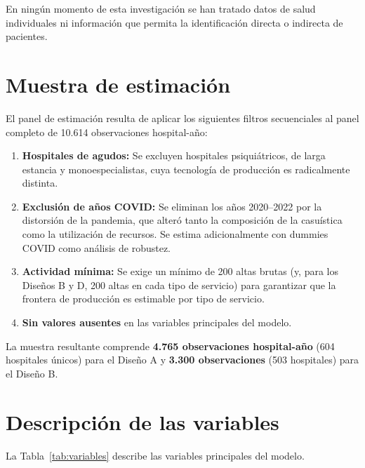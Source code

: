 \documentclass[12pt, a4paper, twoside, openright]{book}
\theoremstyle{plain}
\theoremstyle{definition}
\theoremstyle{remark}
\begin{document}
En ningún momento de esta investigación se han tratado datos de salud individuales ni información que permita la identificación directa o indirecta de pacientes.

\section{Muestra de estimación}

El panel de estimación resulta de aplicar los siguientes filtros secuenciales al panel completo de 10.614 observaciones hospital-año:

\begin{enumerate}
  \item \textbf{Hospitales de agudos:} Se excluyen hospitales psiquiátricos, de larga estancia y monoespecialistas, cuya tecnología de producción es radicalmente distinta.
  \item \textbf{Exclusión de años COVID:} Se eliminan los años 2020--2022 por la distorsión de la pandemia, que alteró tanto la composición de la casuística como la utilización de recursos. Se estima adicionalmente con dummies COVID como análisis de robustez.
  \item \textbf{Actividad mínima:} Se exige un mínimo de 200 altas brutas (y, para los Diseños B y D, 200 altas en cada tipo de servicio) para garantizar que la frontera de producción es estimable por tipo de servicio.
  \item \textbf{Sin valores ausentes} en las variables principales del modelo.
\end{enumerate}

La muestra resultante comprende \textbf{4.765 observaciones hospital-año} (604 hospitales únicos) para el Diseño A y \textbf{3.300 observaciones} (503 hospitales) para el Diseño B.

\section{Descripción de las variables}
\label{sec:variables}

La Tabla~\ref{tab:variables} describe las variables principales del modelo.
\end{document}
